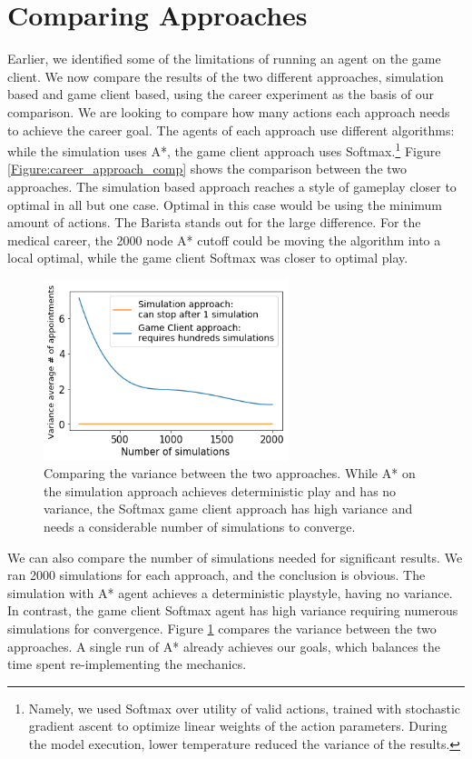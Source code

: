 \documentclass[letterpaper]{article} %
\begin{document}
\vspace{-0.79mm}
\section{Comparing Approaches}

Earlier, we identified some of the limitations of running an agent on the game client. We now compare the results of the two different approaches, simulation based and  game client based, using the career experiment as the basis of our comparison. We are looking to compare how many actions each approach needs to achieve the career goal. The agents of each approach use different algorithms: while the simulation uses A*, the game client approach uses Softmax.\footnote{Namely, we used Softmax over utility of valid actions, trained with stochastic gradient ascent to optimize linear weights of the action parameters.
During the model execution, lower temperature reduced the variance of the results.
}  Figure \ref{Figure:career_approach_comp} shows the comparison between the two approaches. The simulation based approach reaches a style of gameplay closer to optimal in all but one case. Optimal in this case would be using the minimum amount of actions. The Barista stands out for the large difference. For the medical career, the 2000 node A* cutoff could be moving the algorithm into a local optimal, while the game client Softmax was closer to optimal play.

\begin{figure}[t]
\centering
\includegraphics[width=0.8487\linewidth,height=2.07in ]{images/career_average.png}
\caption{Comparing the variance between the two approaches. While A* on the simulation approach achieves deterministic play and has no variance, the Softmax game client approach has high variance and needs a considerable number of simulations to converge.}
\label{Figure:approach_variance_comp}
\end{figure}

We can also compare the number of simulations needed for significant results. We ran 2000 simulations for each approach, and the conclusion is obvious. The simulation with A* agent achieves a deterministic playstyle, having no variance. In contrast, the game client Softmax agent has high variance requiring numerous simulations for convergence. Figure \ref{Figure:approach_variance_comp} compares the variance between the two approaches. A single run of A* already achieves our goals, which balances the time spent re-implementing the mechanics.
\end{document}
